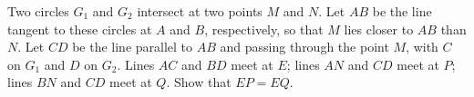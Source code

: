 Two circles $ G_1$ and $ G_2$ intersect at two points $ M$ and $ N$. Let $ AB$ be the line tangent to these circles at $ A$ and $ B$,  respectively, so that $ M$ lies closer to $ AB$ than $ N$. Let $ CD$ be the line parallel to $ AB$ and passing through the point $ M$,  with $ C$ on $ G_1$ and $ D$ on $ G_2$. Lines $ AC$ and $ BD$ meet at $ E$; lines $ AN$ and $ CD$ meet at $ P$; lines $ BN$ and $ CD$ meet at $ Q$. Show that $ EP = EQ$.